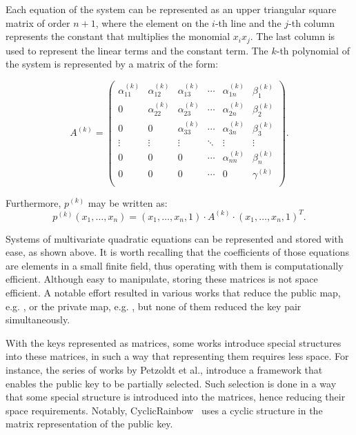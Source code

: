 \documentclass{ufsctex/ufsctex}
\begin{document}
Each equation of the system can be represented as an upper triangular square
matrix of order $n+1$, where the element on the $i$-th line and the $j$-th
column represents the constant that multiplies the monomial $x_i x_j$. The last
column is used to represent the linear terms and the constant term. The $k$-th
polynomial of the system is represented by a matrix of the form:

\begin{equation}\label{eq:matrixrepresentation}
A^{(k)} =
\begin{pmatrix}
\alpha^{(k)}_{11} & \alpha^{(k)}_{12} & \alpha^{(k)}_{13} & \cdots &
	\alpha^{(k)}_{1n} & \beta^{(k)}_1 \\
0 & \alpha^{(k)}_{22} & \alpha^{(k)}_{23} & \cdots &
	\alpha^{(k)}_{2n} & \beta^{(k)}_2 \\
0 & 0 & \alpha^{(k)}_{33} & \cdots &
	\alpha^{(k)}_{3n} & \beta^{(k)}_3 \\
\vdots & \vdots & \vdots & \ddots & \vdots & \vdots \\
0 & 0 & 0 & \cdots & \alpha^{(k)}_{nn} & \beta^{(k)}_n \\
0 & 0 & 0 & \cdots & 0 & \gamma^{(k)} \\
\end{pmatrix}.
\end{equation}

Furthermore, $p^{(k)}$ may be written as:
\begin{equation}
p^{(k)}(x_1,\dots,x_n) =
	(x_1,\dots,x_n,1) \cdot A^{(k)} \cdot (x_1,\dots,x_n,1)^T.
\end{equation}

Systems of multivariate quadratic equations can be represented and stored with
ease, as shown above. It is worth recalling that the coefficients of those
equations are elements in a small finite field, thus operating with them is
computationally efficient. Although easy to manipulate, storing these matrices
is not space efficient. A notable effort resulted in various works that reduce
the public map, e.g. \cite{petzoldt2010cyclicrainbow}, or the private map, e.g.
\cite{yasuda2012reducing}, but none of them reduced the key pair
simultaneously.

With the keys represented as matrices, some works introduce special structures
into these matrices, in such a way that representing them requires less space.
For instance, the series of works by Petzoldt et al., introduce a framework
that enables the public key to be partially selected. Such selection is done in
a way that some special structure is introduced into the matrices, hence
reducing their space requirements. Notably,
CyclicRainbow~\cite{petzoldt2010cyclicrainbow} uses a cyclic structure in the
matrix representation of the public key.
\end{document}
